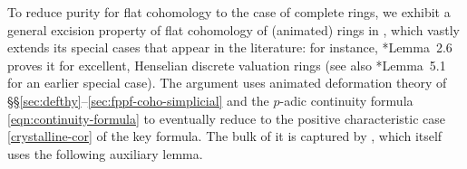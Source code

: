 









 \label{sec:excision}




To reduce purity for flat cohomology to the case of complete rings, we exhibit a general excision property of flat cohomology of (animated) rings in , which vastly extends its special cases that appear in the literature: for instance, \cite{DH19}*{Lemma~2.6} proves it for excellent, Henselian discrete valuation rings (see also \cite{Maz72}*{Lemma~5.1} for an earlier special case). %
 The argument uses animated deformation theory of \S\S\ref{sec:defthy}--\ref{sec:fppf-coho-simplicial} and the $p$-adic continuity formula \eqref{eqn:continuity-formula} to eventually reduce to the positive characteristic case \eqref{crystalline-cor} of the key formula. %
 The bulk of it is captured by , which itself uses the following auxiliary lemma.











